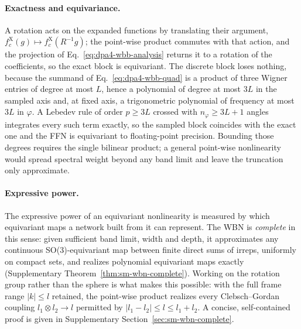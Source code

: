 \paragraph{Exactness and equivariance.}
A rotation acts on the expanded functions by translating their argument, $f^{\mathrm{X}}_c(g)\mapsto f^{\mathrm{X}}_c(R^{-1}g)$; the point-wise product commutes with that action, and the projection of Eq.~\eqref{eq:dpa4-wbb-analysis} returns it to a rotation of the coefficients, so the exact block is equivariant.
The discrete block loses nothing, because the summand of Eq.~\eqref{eq:dpa4-wbb-quad} is a product of three Wigner entries of degree at most $L$, hence a polynomial of degree at most $3L$ in the sampled axis and, at fixed axis, a trigonometric polynomial of frequency at most $3L$ in $\varphi$.
A Lebedev rule of order $p\ge 3L$ crossed with $n_\varphi\ge 3L+1$ angles integrates every such term exactly, so the sampled block coincides with the exact one and the FFN is equivariant to floating-point precision.
Bounding those degrees requires the single bilinear product; a general point-wise nonlinearity would spread spectral weight beyond any band limit and leave the truncation only approximate.

\paragraph{Expressive power.}
The expressive power of an equivariant nonlinearity is measured by which equivariant maps a network built from it can represent.
The WBN is \emph{complete} in this sense: given sufficient band limit, width and depth, it approximates any continuous SO(3)-equivariant map between finite direct sums of irreps, uniformly on compact sets, and realizes polynomial equivariant maps exactly (Supplementary Theorem~\ref{thm:sm-wbn-complete}).
Working on the rotation group rather than the sphere is what makes this possible: with the full frame range $|k|\le l$ retained, the point-wise product realizes every Clebsch--Gordan coupling $l_1\otimes l_2\to l$ permitted by $|l_1-l_2|\le l\le l_1+l_2$.
A concise, self-contained proof is given in Supplementary Section~\ref{sec:sm-wbn-complete}.

